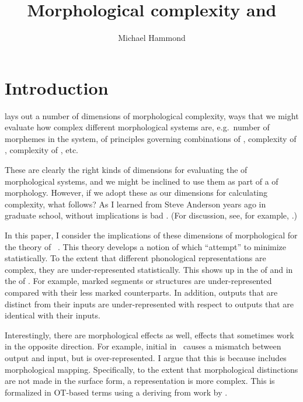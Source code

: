 \documentclass[output=paper,
modfonts
]{LSP/langsci}
\title{Morphological complexity and \io}
\author{Michael Hammond\affiliation{University of Arizona}}
\begin{document}
\maketitle 
\section{Introduction}

\citet{dimensions} lays out a number of dimensions of morphological complexity, ways that we might evaluate how complex different morphological systems are, e.g.\ number of morphemes in the system,  of principles governing combinations of , complexity of , complexity of , etc.

These are clearly the right kinds of dimensions for evaluating the  of morphological systems, and we might be inclined to use them as part of a  of morphology. However, if we adopt these as our dimensions for calculating complexity, what follows? As I learned from Steve Anderson years ago in graduate school,  without implications is bad . (For discussion, see, for example, \citealt{sra.formalist}.)

In this paper, I consider the implications of these dimensions of morphological  for the theory of \io\ \citep{inopt,hammond.complexity,inopt.phon}. This theory develops a notion of  which  ``attempt'' to minimize statistically. To the extent that different phonological representations are complex, they are under-represented statistically. This  shows up in the  of  and in the  of . For example, marked segments or  structures are under-represented compared with their less marked counterparts. In addition, outputs that are distinct from their inputs are under-represented with respect to outputs that are identical with their inputs.

Interestingly, there are morphological effects as well, effects that sometimes work in the opposite direction. For example, initial  in \w\ causes a mismatch between output and input, but is over-represented. I argue that this is because  includes morphological mapping. Specifically, to the extent that morphological distinctions are not made in the surface form, a representation is more complex. This is formalized in OT-based terms using a  deriving from work by \citet{kurisu}.
\end{document}
